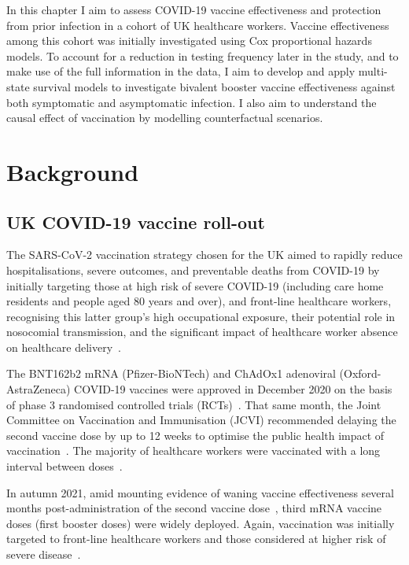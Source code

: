 In this chapter I aim to assess COVID-19 vaccine effectiveness and protection from prior infection in a cohort of UK healthcare workers. Vaccine effectiveness among this cohort was initially investigated using Cox proportional hazards models. To account for a reduction in testing frequency later in the study, and to make use of the full information in the data, I aim to develop and apply multi-state survival models to investigate bivalent booster vaccine effectiveness against both symptomatic and asymptomatic infection. I also aim to understand the causal effect of vaccination by modelling counterfactual scenarios.

\section{Background}

\subsection{UK COVID-19 vaccine roll-out}

The SARS-CoV-2 vaccination strategy chosen for the UK aimed to rapidly reduce hospitalisations, severe outcomes, and preventable deaths from COVID-19 by initially targeting those at high risk of severe COVID-19 (including care home residents and people aged 80 years and over), and front-line healthcare workers, recognising this latter group's high occupational exposure, their potential role in nosocomial transmission, and the significant impact of healthcare worker absence on healthcare delivery~\parencite{Department-of-Health-and-Social-Care2021-ud, Department_of_Health_and_Social_Care2020-mk}.

The BNT162b2 mRNA (Pfizer-BioNTech) and ChAdOx1 adenoviral (Oxford-AstraZeneca) COVID-19 vaccines were approved in December 2020 on the basis of phase 3 randomised controlled trials (RCTs)~\parencite{Voysey2021-lc, Polack2020-ry}. That same month, the Joint Committee on Vaccination and Immunisation (JCVI) recommended delaying the second vaccine dose by up to 12 weeks to optimise the public health impact of vaccination~\parencite{Department-of-Health-and-Social-Care2021-fm}. The majority of healthcare workers were vaccinated with a long interval between doses~\parencite{Hall2022-ep}.

In autumn 2021, amid mounting evidence of waning vaccine effectiveness several months post-administration of the second vaccine dose~\parencite{Nordstrom2022-gf, Andrews2022-qd, Chemaitelly2022-mo, Hall2022-ep, Smid2022-bk, Goldberg2021-wb}, third mRNA vaccine doses (first booster doses) were widely deployed. Again, vaccination was initially targeted to front-line healthcare workers and those considered at higher risk of severe disease~\parencite{Joint_Committee_on_Vaccination_and_Immunisation2021-hq}.

